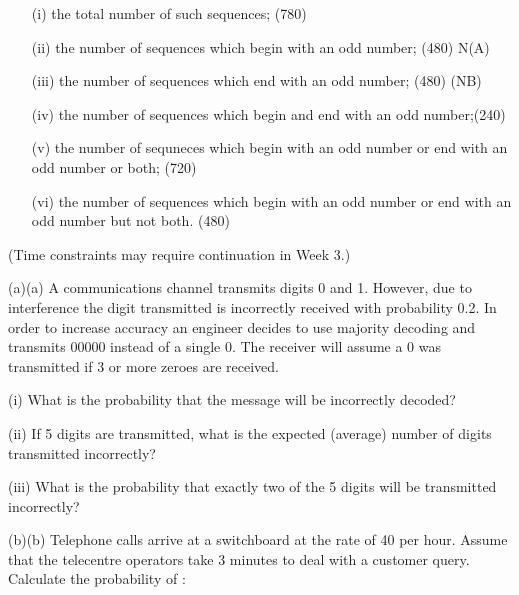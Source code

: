 \documentclass[]{report}
\begin{document}
\begin{itemize}
	\item[(i)] the total number of such sequences; (780)
	\item[(ii)] the number of sequences which begin with an odd number; (480) N(A)
	\item[(iii)] the number of sequences which end with an odd number; (480) (NB)
	\item[(iv)] the number of sequences which begin and end with an odd number;(240)
	\item[(v)] the number of sequneces which begin with an odd number or end with an
	odd number or both; (720)
	\item[(vi)] the number of sequences which begin with an odd number or end with an
	odd number but not both. (480)
\end{itemize}



\newpage

(Time constraints may require continuation in Week 3.)



(a)(a)    A communications channel transmits digits 0 and 1.  However, due to interference the digit transmitted is incorrectly received with probability 0.2.  In order to increase accuracy an engineer decides to use majority decoding and transmits 00000 instead of a single 0.  The receiver will assume a 0 was transmitted if 3 or more zeroes are received. 

\item[(i)]                  What is the probability that the message will be incorrectly decoded?
\item[(ii)]                If 5 digits are transmitted, what is the expected (average) number of digits transmitted incorrectly?
\item[(iii)]               What is the probability that exactly two of the 5 digits will be transmitted incorrectly?


(b)(b)   Telephone calls arrive at a switchboard at the rate of 40 per hour.  Assume that the telecentre operators take 3 minutes to deal with a customer query.  Calculate the probability of :
\end{document}
